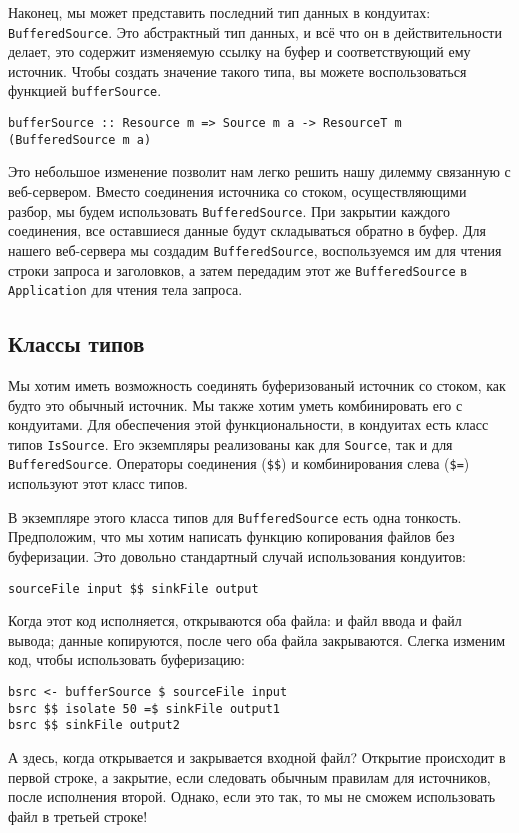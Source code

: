 Наконец, мы может представить последний тип данных в кондуитах: 
\lstinline'BufferedSource'. Это абстрактный тип данных, и всё что он в 
действительности делает, это содержит изменяемую ссылку на буфер и 
соответствующий ему источник. Чтобы создать значение такого типа, вы можете 
воспользоваться функцией \lstinline'bufferSource'.
\begin{verbatim}
bufferSource :: Resource m => Source m a -> ResourceT m (BufferedSource m a)
\end{verbatim}
Это небольшое изменение позволит нам легко решить нашу дилемму связанную с 
веб-сервером. Вместо соединения источника со стоком, осуществляющими разбор, 
мы будем использовать \lstinline'BufferedSource'. При закрытии каждого 
соединения, все оставшиеся данные будут складываться обратно в буфер. 
Для нашего веб-сервера мы создадим \lstinline'BufferedSource', воспользуемся 
им для чтения строки запроса и заголовков, а затем передадим этот же
\lstinline'BufferedSource' в \lstinline{Application} для чтения тела запроса.

\subsection{Классы типов}
Мы хотим иметь возможность соединять буферизованый источник со стоком,
как будто это обычный источник.
Мы также хотим уметь комбинировать его с кондуитами. Для обеспечения этой функциональности,
в кондуитах есть класс типов \lstinline'IsSource'. Его экземпляры реализованы как для
\lstinline'Source', так и для \lstinline'BufferedSource'. 
Операторы соединения (\verb#$$#) и комбинирования слева (\verb#$=#) используют этот класс типов.

В экземпляре этого класса типов для \lstinline'BufferedSource' есть одна тонкость.
Предположим, что мы хотим написать функцию копирования файлов без
буферизации. Это довольно стандартный случай использования кондуитов:
\begin{lstlisting}
sourceFile input $$ sinkFile output
\end{lstlisting}
Когда этот код исполняется, открываются оба файла: и файл ввода и файл вывода; данные 
копируются, после чего оба файла закрываются. Слегка изменим код, чтобы 
использовать буферизацию:
\begin{lstlisting}
bsrc <- bufferSource $ sourceFile input
bsrc $$ isolate 50 =$ sinkFile output1
bsrc $$ sinkFile output2
\end{lstlisting}
А здесь, когда открывается и закрывается входной файл? Открытие
происходит в первой строке, а закрытие, если следовать обычным 
правилам для источников, после исполнения второй.
Однако, если это так, то мы не сможем использовать файл в третьей строке!

